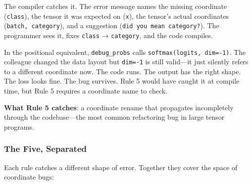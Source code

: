 \documentclass[11pt,titlepage]{article}
\begin{document}
The compiler catches it. The error message names the missing coordinate
(\texttt{class}), the tensor it was expected on (\texttt{x}), the
tensor's actual coordinates (\texttt{batch,\ category}), and a
suggestion
(\texttt{did\ you\ mean\ \textquotesingle{}category\textquotesingle{}?}).
The programmer sees it, fixes \texttt{class} → \texttt{category}, and
the code compiles.

In the positional equivalent, \texttt{debug\_probs} calls
\texttt{softmax(logits,\ dim=-1)}. The colleague changed the data layout
but \texttt{dim=-1} is still valid---it just silently refers to a
different coordinate now. The code runs. The output has the right shape.
The loss looks fine. The bug survives. Rule 5 would have caught it at
compile time, but Rule 5 requires a coordinate name to check.

\textbf{What Rule 5 catches}: a coordinate rename that propagates
incompletely through the codebase---the most common refactoring bug in
large tensor programs.

\vspace{2em}

\hypertarget{the-five-separated}{%
\subsubsection{The Five, Separated}\label{the-five-separated}}

Each rule catches a different shape of error. Together they cover the
space of coordinate bugs:
\end{document}
